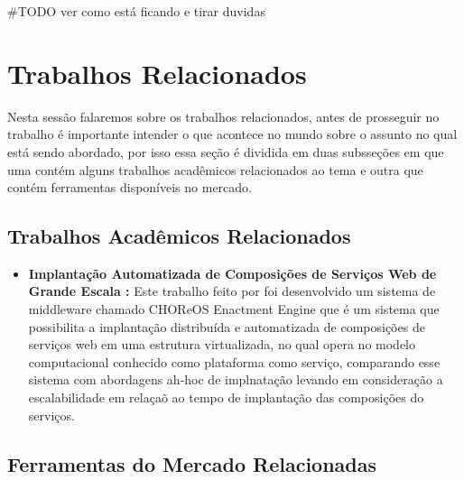 #TODO ver como está ficando e tirar duvidas

\section{Trabalhos Relacionados}

Nesta sessão falaremos sobre os trabalhos relacionados, antes de prosseguir no
trabalho é importante intender o que acontece no mundo sobre o assunto no qual
está sendo abordado, por isso essa seção é dividida em duas subsseções em que uma
contém alguns trabalhos acadêmicos relacionados ao tema e outra que contém
ferramentas disponíveis no mercado.

\subsection{Trabalhos Acadêmicos Relacionados}

\begin{itemize}
  \item  \textbf{Implantação Automatizada de Composições de Serviços Web de Grande Escala :}
  Este trabalho feito por \cite{leo2014} foi desenvolvido um sistema de middleware
  chamado CHOReOS Enactment Engine que é um sistema que possibilita a implantação
  distribuída e automatizada de composições de serviços web em uma estrutura virtualizada,
  no qual opera no modelo computacional conhecido como plataforma como serviço,
  comparando esse sistema com abordagens ah-hoc de implnatação levando em consideração
  a escalabilidade em relaçaõ ao tempo de implantação das composições do serviços.
\end{itemize}

\subsection{Ferramentas do Mercado Relacionadas}

